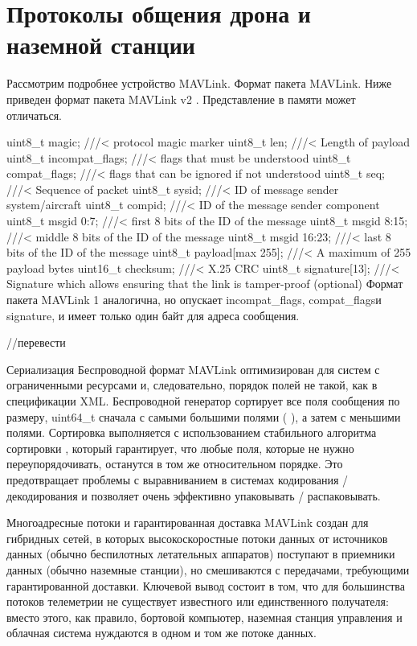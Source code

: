 
\section{Протоколы общения дрона и наземной станции}
Рассмотрим подробнее устройство MAVLink.
Формат пакета MAVLink.
Ниже приведен формат пакета MAVLink v2 . Представление в памяти может отличаться.

uint8\_t magic;              ///< protocol magic marker
uint8\_t len;                ///< Length of payload
uint8\_t incompat\_flags;     ///< flags that must be understood
uint8\_t compat\_flags;       ///< flags that can be ignored if not understood
uint8\_t seq;                ///< Sequence of packet
uint8\_t sysid;              ///< ID of message sender system/aircraft
uint8\_t compid;             ///< ID of the message sender component
uint8\_t msgid 0:7;          ///< first 8 bits of the ID of the message
uint8\_t msgid 8:15;         ///< middle 8 bits of the ID of the message
uint8\_t msgid 16:23;        ///< last 8 bits of the ID of the message
uint8\_t payload[max 255];   ///< A maximum of 255 payload bytes
uint16\_t checksum;          ///< X.25 CRC
uint8\_t signature[13];      ///< Signature which allows ensuring that the link is tamper-proof (optional)
Формат пакета MAVLink 1 аналогична, но опускает incompat\_flags, compat\_flagsи signature, и имеет только один байт для адреса сообщения.

//перевести

Сериализация
Беспроводной формат MAVLink оптимизирован для систем с ограниченными ресурсами и, следовательно, порядок полей не такой, как в спецификации XML. Беспроводной генератор сортирует все поля сообщения по размеру, uint64\_t сначала с самыми большими полями ( ), а затем с меньшими полями. Сортировка выполняется с использованием стабильного алгоритма сортировки , который гарантирует, что любые поля, которые не нужно переупорядочивать, останутся в том же относительном порядке. Это предотвращает проблемы с выравниванием в системах кодирования / декодирования и позволяет очень эффективно упаковывать / распаковывать.

Многоадресные потоки и гарантированная доставка
MAVLink создан для гибридных сетей, в которых высокоскоростные потоки данных от источников данных (обычно беспилотных летательных аппаратов) поступают в приемники данных (обычно наземные станции), но смешиваются с передачами, требующими гарантированной доставки. Ключевой вывод состоит в том, что для большинства потоков телеметрии не существует известного или единственного получателя: вместо этого, как правило, бортовой компьютер, наземная станция управления и облачная система нуждаются в одном и том же потоке данных.

